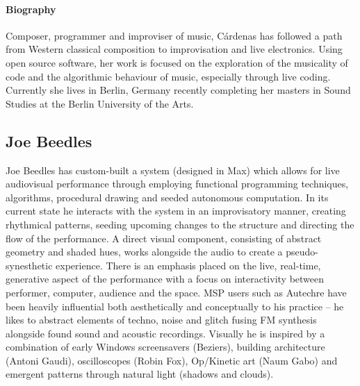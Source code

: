 \documentclass[sigplan,10pt,review]{acmart}\settopmatter{printfolios=true}
\begin{document}
\paragraph{Biography} Composer, programmer and improviser of music, C\'{a}rdenas has
followed a path from Western classical composition to improvisation
and live electronics. Using open source software, her work is focused
on the exploration of the musicality of code and the algorithmic
behaviour of music, especially through live coding. Currently she
lives in Berlin, Germany recently completing her masters in Sound
Studies at the Berlin University of the Arts.

\subsection{Joe Beedles}

Joe Beedles has custom-built a 
system (designed in Max) which allows for live audiovisual performance
through employing functional programming techniques, algorithms,
procedural drawing and seeded autonomous computation. In its current
state he interacts with the system in an improvisatory manner, creating
rhythmical patterns, seeding upcoming changes to the structure and
directing the flow of the performance. A direct visual component,
consisting of abstract geometry and shaded hues, works alongside the
audio to create a pseudo-synesthetic experience. There is an emphasis
placed on the live, real-time, generative aspect of the performance
with a focus on interactivity between performer, computer, audience
and the space. MSP users such as Autechre have been heavily
influential both aesthetically and conceptually to his practice -- he
likes to abstract elements of techno, noise and glitch fusing FM
synthesis alongside found sound and acoustic recordings. Visually he is
inspired by a combination of early Windows screensavers (Beziers),
building architecture (Antoni Gaudi), oscilloscopes (Robin Fox),
Op/Kinetic art (Naum Gabo) and emergent patterns through natural light
(shadows and clouds).
\end{document}
